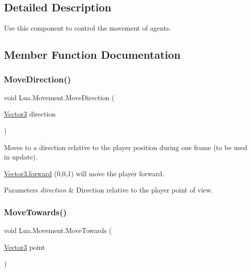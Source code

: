 \subsection{Detailed Description}
Use this component to control the movement of agents. 



\subsection{Member Function Documentation}
\mbox{\label{class_lua_1_1_movement_ab1a73835885dca908bb6e5d23509ce40}} 
\subsubsection{\texorpdfstring{MoveDirection()}{MoveDirection()}}
{\footnotesize\ttfamily void Lua.\+Movement.\+Move\+Direction (\begin{DoxyParamCaption}\item[{\mbox{\hyperlink{class_lua_1_1_vector3}{Vector3}}}]{direction }\end{DoxyParamCaption})}



Moves to a direction relative to the player position during one frame (to be used in update). 

\mbox{\hyperlink{class_lua_1_1_vector3_ad8be15240d9bfa336d926ab023f11ad4}{Vector3.\+forward}} (0,0,1) will move the player forward. 


\begin{DoxyParams}{Parameters}
{\em direction} & Direction relative to the player point of view.\\
\hline
\end{DoxyParams}
\mbox{\label{class_lua_1_1_movement_a6e9301bc7326c56f23fbb2eac2ad2f54}} 
\subsubsection{\texorpdfstring{MoveTowards()}{MoveTowards()}}
{\footnotesize\ttfamily void Lua.\+Movement.\+Move\+Towards (\begin{DoxyParamCaption}\item[{\mbox{\hyperlink{class_lua_1_1_vector3}{Vector3}}}]{point }\end{DoxyParamCaption})}



